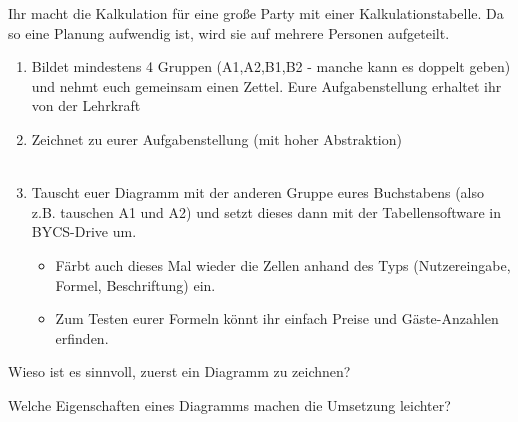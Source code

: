 {
    Ihr macht die Kalkulation für eine große Party mit einer Kalkulationstabelle. Da so eine Planung aufwendig ist, wird sie auf mehrere Personen aufgeteilt.
    \begin{enumerate}
        \item Bildet mindestens 4 Gruppen (A1,A2,B1,B2 - manche kann es doppelt geben) und nehmt euch gemeinsam einen Zettel. Eure Aufgabenstellung erhaltet ihr von der Lehrkraft 
        \item Zeichnet zu eurer Aufgabenstellung  (mit hoher Abstraktion)\\
            \\
        \item Tauscht euer Diagramm mit der anderen Gruppe eures Buchstabens (also z.B. tauschen A1 und A2) und setzt dieses dann mit der Tabellensoftware in BYCS-Drive um. \begin{itemize}
        \item Färbt auch dieses Mal wieder die Zellen anhand des Typs (Nutzereingabe, Formel, Beschriftung) ein.
            \item Zum Testen eurer Formeln könnt ihr einfach Preise und Gäste-Anzahlen erfinden.
        \end{itemize}
    \end{enumerate}

    Wieso ist es sinnvoll, zuerst ein Diagramm zu zeichnen?



    Welche Eigenschaften eines Diagramms machen die Umsetzung leichter?

}
